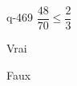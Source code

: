 \begin{truefalse}{q-469}
$\dfrac{48}{70} \leq \dfrac{2}{3}$
\item Vrai
\item* Faux
\end{truefalse}

